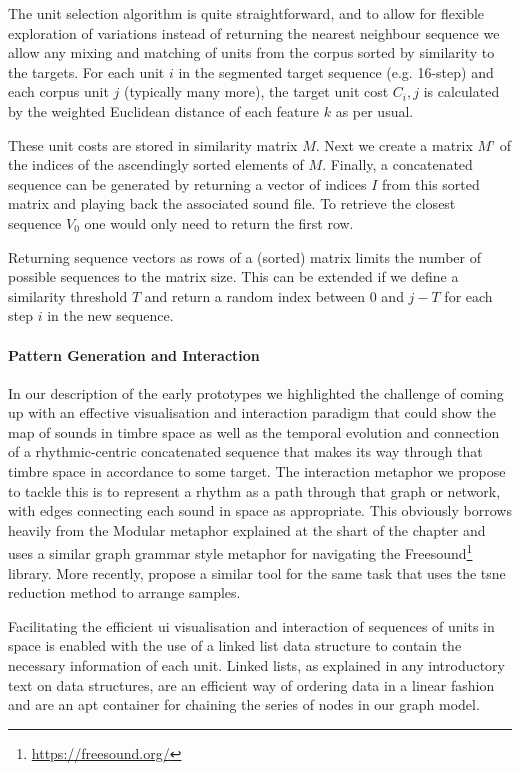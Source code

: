 The unit selection algorithm is quite straightforward, and to allow for flexible exploration of variations instead of returning the nearest neighbour sequence we allow any mixing and matching of units from the corpus sorted by similarity to the targets. For each unit $i$ in the segmented target sequence (e.g. 16-step) and each corpus unit $j$ (typically many more), the target unit cost $C_i,j$ is calculated by the weighted Euclidean distance of each feature $k$ as per usual.

These unit costs are stored in similarity matrix $M$. Next we create a matrix $M’$ of the indices of the ascendingly sorted elements of $M$. Finally, a concatenated sequence can be generated by returning a vector of indices $I$ from this sorted matrix and playing back the associated sound file. To retrieve the closest sequence $V_0$ one would only need to return the first row.

Returning sequence vectors as rows of a (sorted) matrix limits the number of possible sequences to the matrix size. This can be extended if we define a similarity threshold $T$ and return a random index between $0$ and $j − T$ for each step $i$ in the new sequence.

\paragraph{Pattern Generation and Interaction}

In our description of the early prototypes we highlighted the challenge of coming up with an effective visualisation and interaction paradigm that could show the map of sounds in timbre space as well as the temporal evolution and connection of a rhythmic-centric concatenated sequence that makes its way through that timbre space in accordance to some target. The interaction metaphor we propose to tackle this is to represent a rhythm as a path through that graph or network, with edges connecting each sound in space as appropriate. This obviously borrows heavily from the Modular metaphor explained at the shart of the chapter and \cite{Roma2010} uses a similar graph grammar style metaphor for navigating the Freesound\footnote{\url{https://freesound.org/}} library. More recently, \cite{Font2017} propose a similar tool for the same task that uses the \acrshort{tsne} reduction method to arrange samples.

Facilitating the efficient \acrshort{ui} visualisation and interaction of sequences of units in space is enabled with the use of a linked list data structure to contain the necessary information of each unit. Linked lists, as explained in any introductory text on data structures, are an efficient way of ordering data in a linear fashion and are an apt container for chaining the series of nodes in our graph model.

